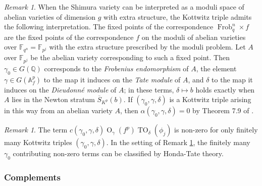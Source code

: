 \documentclass[11pt,a4paper]{article}
\theoremstyle{definition}
\theoremstyle{plain}
\theoremstyle{remark}
\newtheorem{R}[shared]{Remark}
\theoremstyle{plain}
\DeclareMathOperator{\Frob}{Frob}
\DeclareMathOperator{\Or}{O}
\DeclareMathOperator{\TO}{TO}
\begin{document}
\begin{R}\label{interpretation}
    When the Shimura variety can be interpreted as a moduli space of abelian varieties of dimension $g$ with extra structure, the Kottwitz triple admits the following interpretation. The fixed points of the correspondence $\Frob_q^n \times f$ are the fixed points of the correspondence $f$ on the moduli of abelian varieties over $\mathbb{F}_{q^n} = \mathbb{F}_{p^j}$ with the extra structure prescribed by the moduli problem. Let $A$ over $\mathbb{F}_{p^j}$ be the abelian variety corresponding to such a fixed point. Then $\gamma_0 \in G(\mathbb{Q})$ corresponds to the \textit{Frobenius endomorphism} of $A$, the element $\gamma \in G(\mathbb{A}_f^p)$ to the map it induces on the \textit{Tate module} of $A$, and $\delta$ to the map it induces on the \textit{Dieudonn\'e module} of $A$; in these terms, $\delta \mapsto b$ holds exactly when $A$ lies in the Newton stratum $\overline{S}_{K^p}(b)$. If $(\gamma_0,\gamma,\delta)$ is a Kottwitz triple arising in this way from an abelian variety $A$, then $\alpha(\gamma_0, \gamma, \delta) = 0$ by Theorem 7.9 of \cite{MR1155229}.
\end{R}

\begin{R}
The term $c(\gamma_0, \gamma, \delta) \Or_{\gamma}(f^p) \TO_{\delta}(\phi_j)$ is non-zero for only finitely many Kottwitz triples $(\gamma_0, \gamma, \delta)$. In the setting of Remark \ref{interpretation}, the finitely many $\gamma_0$ contributing non-zero terms can be classified by Honda-Tate theory.
\end{R}

\subsubsection*{Complements}
\end{document}
